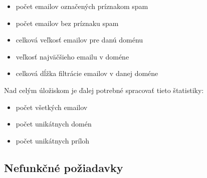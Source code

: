 \documentclass[11pt,twoside,a4paper]{book}
\begin{document}
\begin{itemize}
  \item
  počet emailov označených príznakom spam
  \item
  počet emailov bez príznaku spam
  \item
  celková veľkosť emailov pre danú doménu
  \item
  veľkosť najväčšieho emailu v doméne
  \item 
  celková dĺžka filtrácie emailov v danej doméne %
\end{itemize}
\noindent
Nad celým úložiskom je ďalej potrebné spracovať tieto štatistiky:
\begin{itemize}
  \item
  počet všetkých emailov
  \item 
  počet unikátnych domén
  \item
  počet unikátnych príloh
\end{itemize}






\subsection{Nefunkčné požiadavky}
\end{document}
